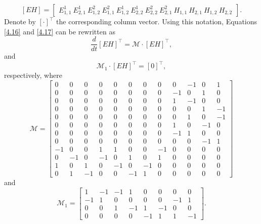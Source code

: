\documentclass[english]{article}
\theoremstyle{plain}
\theoremstyle{definition}
\theoremstyle{remark}
\numberwithin{equation}{section}
\begin{document}
 \begin{equation*}\label{}
  [EH]=
   \begin{bmatrix} E^1_{1,1} \ E^1_{2,1} \ E^2_{1,2} \ E^2_{1,1} \ E^1_{1,2} \ E^1_{2,2} \ E^2_{2,2} \  E^2_{2,1} \ H_{1,1} \ H_{2,1}\ H_{1,2} \ H_{2,2}\end{bmatrix}.
  \end{equation*}
  Denote by $[\cdot]^\top$ the corresponding column vector. Using this notation, Equations \eqref{4.16} and \eqref{4.17}  can be rewritten as
 \begin{equation}\label{4.18}
\frac{d}{dt}[EH]^\top=\mathcal{M}\cdot[EH]^\top,
 \end{equation}
 and
  \begin{equation}\label{4.19}
\mathcal{M}_1\cdot[EH]^\top=[0]^\top,
 \end{equation}
 respectively, where
 \begin{equation*}
 \mathcal{M}=
\begin{bmatrix}
0 & 0 & 0 & 0 & 0 & 0 & 0 & 0 & 0 & -1 & 0 & 1 \\
0 & 0 & 0 & 0 & 0 & 0 & 0 & 0 & -1 & 0 & 1 & 0 \\
0 & 0 & 0 & 0 & 0 & 0 & 0 & 0 & 1 & -1 & 0 & 0 \\
0 & 0 & 0 & 0 & 0 & 0 & 0 & 0 & 0 & 0 & 1 & -1 \\
0 & 0 & 0 & 0 & 0 & 0 & 0 & 0 & 0 & 1 & 0 & -1 \\
0 & 0 & 0 & 0 & 0 & 0 & 0 & 0 & 1 & 0 & -1 & 0 \\
0 & 0 & 0 & 0 & 0 & 0 & 0 & 0 & -1 & 1 & 0 & 0 \\
0 & 0 & 0 & 0 & 0 & 0 & 0 & 0 & 0 & 0 & -1 & 1 \\
-1 & 0 & 0 & 1 & 1 & 0 & 0 & -1 & 0 & 0 & 0 & 0 \\
0 & -1 & 0 & -1 & 0 & 1 & 0 & 1 & 0 & 0 & 0 & 0 \\
1 & 0 & 1 & 0 & -1 & 0 & -1 & 0 & 0 & 0 & 0 & 0 \\
0 & 1 & -1 & 0 & 0 & -1 & 1 & 0 & 0 & 0 & 0 & 0
\end{bmatrix}
\end{equation*}
and
\begin{equation*}
\mathcal{M}_1=
\begin{bmatrix}
1 & -1 & -1 & 1 & 0 & 0 & 0 & 0 \\
-1 & 1 & 0 & 0 & 0 & 0 & -1 & 1\\
0 & 0 & 1 & -1 & 1 & -1 & 0 & 0\\
0 & 0 & 0 & 0 & -1 & 1 & 1 & -1
\end{bmatrix}.
\end{equation*}
\end{document}
